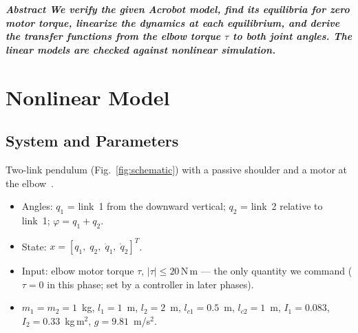 \documentclass[10pt,twocolumn,letterpaper]{article}
\newcommand{\Nm}{\,\mathrm{N\,m}}
\begin{document}

{\footnotesize\bfseries\itshape Abstract\/\textemdash\upshape
We verify the given Acrobot model, find its equilibria for zero motor torque, linearize the dynamics at each equilibrium, and derive the transfer functions from the elbow torque $\tau$ to both joint angles. The linear models are checked against nonlinear simulation.\par}

\section{Nonlinear Model}
\subsection{System and Parameters}
Two-link pendulum (Fig.~\ref{fig:schematic}) with a passive shoulder and a motor at the elbow~\cite{spong95,tedrake}.
\begin{itemize}
\item Angles: $q_1$ = link~1 from the downward vertical; $q_2$ = link~2 relative to link~1; $\varphi=q_1+q_2$.
\item State: $x=[q_1,\;q_2,\;\dot q_1,\;\dot q_2]^T$.
\item Input: elbow motor torque $\tau$, $|\tau|\le20\Nm$ --- the only quantity we command ($\tau=0$ in this phase; set by a controller in later phases).
\item $m_1=m_2=1$~kg, $l_1=1$~m, $l_2=2$~m, $l_{c1}=0.5$~m, $l_{c2}=1$~m, $I_1=0.083$, $I_2=0.33$~kg\,m$^2$, $g=9.81$~m/s$^2$.
\end{itemize}
\end{document}
